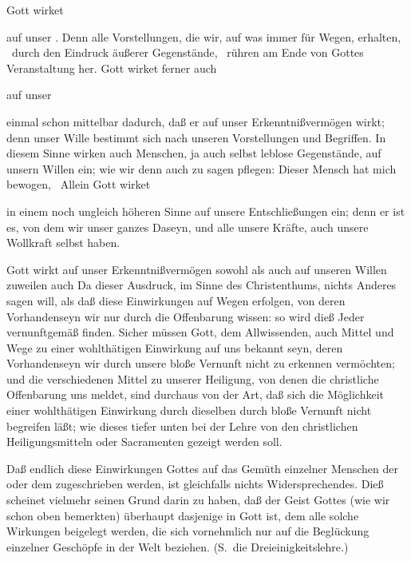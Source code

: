 \begin{aufza}
\item Gott wirket
\begin{aufzb}
\item auf unser . Denn alle Vorstellungen, die wir, auf was immer für Wegen, erhalten, \zB\ durch den Eindruck äußerer Gegenstände, \usw\ rühren am Ende von Gottes Veranstaltung her. Gott wirket ferner auch
\item auf unser 
\begin{aufzc}
\item einmal schon mittelbar dadurch, daß er auf unser Erkenntnißvermögen wirkt; denn unser Wille bestimmt sich nach unseren Vorstellungen und Begriffen. In diesem Sinne wirken auch Menschen, ja auch selbst leblose Gegenstände, auf unsern Willen ein; wie wir denn auch zu sagen pflegen: Dieser Mensch hat mich bewogen, \udgl\  Allein Gott wirket
\item in einem noch ungleich höheren Sinne auf unsere Entschließungen ein; denn er ist es, von dem wir unser ganzes Daseyn, und alle unsere Kräfte, auch unsere Wollkraft selbst haben.
\end{aufzc}
\item Gott wirkt auf unser Erkenntnißvermögen sowohl als auch auf unseren Willen zuweilen auch  Da dieser Ausdruck, im Sinne des Christenthums, nichts Anderes sagen will, als daß diese Einwirkungen auf Wegen erfolgen, von deren Vorhandenseyn wir nur durch die Offenbarung wissen: so wird dieß Jeder vernunftgemäß finden. Sicher müssen Gott, dem Allwissenden, auch Mittel und Wege zu einer wohlthätigen Einwirkung auf uns bekannt seyn, deren Vorhandenseyn wir durch unsere bloße Vernunft nicht zu erkennen vermöchten; und die verschiedenen Mittel zu unserer Heiligung, von denen die christliche Offenbarung uns meldet, sind durchaus von der Art, daß sich die Möglichkeit einer wohlthätigen Einwirkung durch dieselben durch bloße Vernunft nicht begreifen läßt; wie dieses tiefer unten bei der Lehre von den christlichen Heiligungsmitteln oder Sacramenten gezeigt werden soll.~
\item Daß endlich diese Einwirkungen Gottes auf das Gemüth einzelner Menschen der  oder dem  zugeschrieben werden, ist gleichfalls nichts Widersprechendes. Dieß scheinet vielmehr seinen Grund darin zu haben, daß der Geist Gottes (wie wir schon oben bemerkten) überhaupt dasjenige in Gott ist, dem alle solche Wirkungen beigelegt werden, die sich vornehmlich nur auf die Beglückung einzelner Geschöpfe in der Welt beziehen. (S.\ die Dreieinigkeitslehre.)

\end{aufzb}
\end{aufza}
